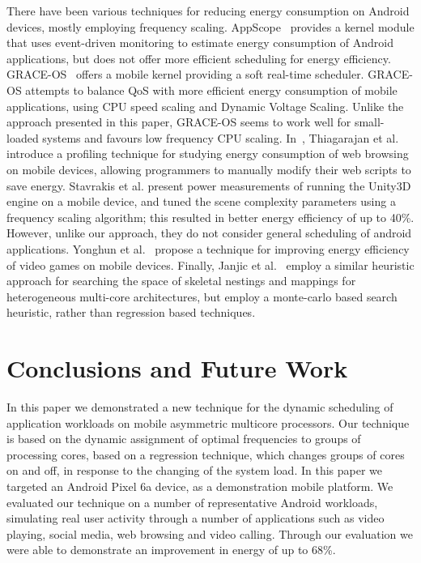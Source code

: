 \documentclass[conference]{IEEEtran}
\begin{document}
There have been various techniques for reducing energy consumption on Android devices, mostly employing frequency scaling. AppScope~\cite{Yoon} provides a kernel module that uses event-driven monitoring to estimate energy consumption of Android applications, but does not offer more efficient scheduling for energy efficiency. GRACE-OS~\cite{wanghong} offers a mobile kernel providing a soft real-time scheduler. GRACE-OS attempts to balance QoS with more efficient energy consumption of mobile applications, using CPU speed scaling and Dynamic Voltage Scaling. Unlike the approach presented in this paper, GRACE-OS seems to work well for small-loaded systems and favours low frequency CPU scaling. In~\cite{narendran}, Thiagarajan et al. introduce a profiling technique for studying energy consumption of web browsing on mobile devices, allowing programmers to manually modify their web scripts to save energy. Stavrakis et al. present power measurements of running the Unity3D engine on a mobile device, and tuned the scene complexity parameters using a frequency scaling algorithm; this resulted in better energy efficiency of up to 40\%. However, unlike our approach, they do not consider general scheduling of android applications. Yonghun et al.~\cite{Yonghun} propose a technique for improving energy efficiency of video games on mobile devices. Finally, Janjic et al.~\cite{monte} employ a similar heuristic approach for searching the space of skeletal nestings and mappings for heterogeneous multi-core architectures, but employ a monte-carlo based search heuristic, rather than regression based techniques. 

\section{Conclusions and Future Work} \label{sec:conclusions}

In this paper we demonstrated a new technique for the dynamic scheduling of application workloads on mobile asymmetric multicore processors. Our technique is based on the dynamic assignment of optimal frequencies to groups of processing cores, based on a regression technique, which changes groups of cores on and off, in response to the changing of the system load. In this paper we targeted an Android Pixel 6a device, as a demonstration mobile platform. We evaluated our technique on a number of representative Android workloads, simulating real user activity through a number of applications such as video playing, social media, web browsing and video calling. Through our evaluation we were able to demonstrate an improvement in energy of up to 68\%.
\end{document}

